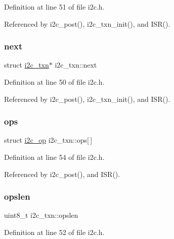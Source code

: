 Definition at line 51 of file i2c.\+h.



Referenced by i2c\+\_\+post(), i2c\+\_\+txn\+\_\+init(), and I\+S\+R().

\mbox{\label{structi2c__txn_a11186c957c400dc51479a883575d4b0d}} 
\subsubsection{\texorpdfstring{next}{next}}
{\footnotesize\ttfamily struct \hyperlink{structi2c__txn}{i2c\+\_\+txn}$\ast$ i2c\+\_\+txn\+::next}



Definition at line 50 of file i2c.\+h.



Referenced by i2c\+\_\+post(), i2c\+\_\+txn\+\_\+init(), and I\+S\+R().

\mbox{\label{structi2c__txn_a49e5dbfb39ee1df7021f37ec67c8d2e0}} 
\subsubsection{\texorpdfstring{ops}{ops}}
{\footnotesize\ttfamily struct \hyperlink{structi2c__op}{i2c\+\_\+op} i2c\+\_\+txn\+::ops\mbox{[}$\,$\mbox{]}}



Definition at line 54 of file i2c.\+h.



Referenced by i2c\+\_\+post(), and I\+S\+R().

\mbox{\label{structi2c__txn_ad936e904a9dcf5cb352e1b8a1dac60bc}} 
\subsubsection{\texorpdfstring{opslen}{opslen}}
{\footnotesize\ttfamily uint8\+\_\+t i2c\+\_\+txn\+::opslen}



Definition at line 52 of file i2c.\+h.



